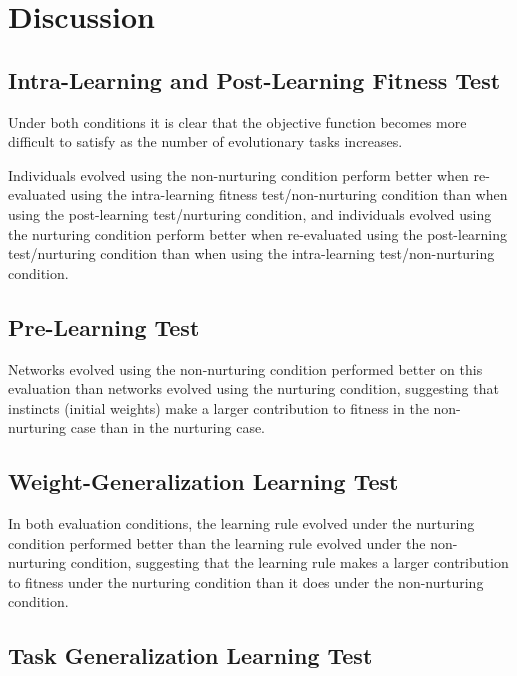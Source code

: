 \documentclass[master]{outhesis}
\begin{document}
\chapter{Discussion}

\section{Intra-Learning and Post-Learning Fitness Test}

Under both conditions it is clear that the objective function becomes more difficult to satisfy as the number of evolutionary tasks increases. 

Individuals evolved using the non-nurturing condition perform better when re-evaluated using the intra-learning fitness test/non-nurturing condition than when using the post-learning test/nurturing condition, and individuals evolved using the nurturing condition perform better when re-evaluated using the post-learning test/nurturing condition than when using the intra-learning test/non-nurturing condition.

\section{Pre-Learning Test}

Networks evolved using the non-nurturing condition performed better on this evaluation than networks evolved using the nurturing condition, suggesting that instincts (initial weights) make a larger contribution to fitness in the non-nurturing case than in the nurturing case.

\section{Weight-Generalization Learning Test}

In both evaluation conditions, the learning rule evolved under the nurturing condition performed better than the learning rule evolved under the non-nurturing condition, suggesting that the learning rule makes a larger contribution to fitness under the nurturing condition than it does under the non-nurturing condition.

\section{Task Generalization Learning Test}
\end{document}
